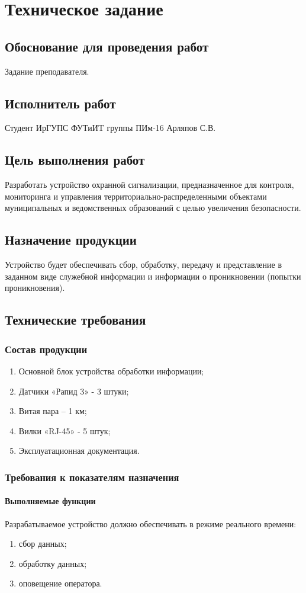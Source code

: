 \chapter{Техническое задание}
	\section{Обоснование для проведения работ}
		Задание преподавателя.
	\section{Исполнитель работ}
		Студент ИрГУПС ФУТиИT группы ПИм-16 Арляпов С.В.
	\section{Цель выполнения работ}
		Разработать устройство охранной сигнализации, предназначенное для контроля, мониторинга и управления территориально-распределенными объектами муниципальных и ведомственных образований с целью увеличения безопасности.
	\section{Назначение продукции}
		Устройство будет обеспечивать сбор, обработку, передачу и представление в заданном виде служебной информации и информации о проникновении (попытки проникновения).
	\section{Технические требования}
		\subsection{Состав продукции}
		 	\begin{enumerate}
				\item Основной блок устройства обработки информации;
				\item Датчики «Рапид 3» - 3 штуки;
				\item Витая пара – 1 км;
				\item Вилки «RJ-45» - 5 штук;
				\item Эксплуатационная документация.
			\end{enumerate}
		\subsection{Требования к показателям назначения}
			\subsubsection{Выполняемые функции}
				Разрабатываемое устройство должно обеспечивать в режиме реального времени:
				\begin{enumerate}
					\item сбор данных;
					\item обработку данных;
					\item оповещение оператора.
				\end{enumerate}
